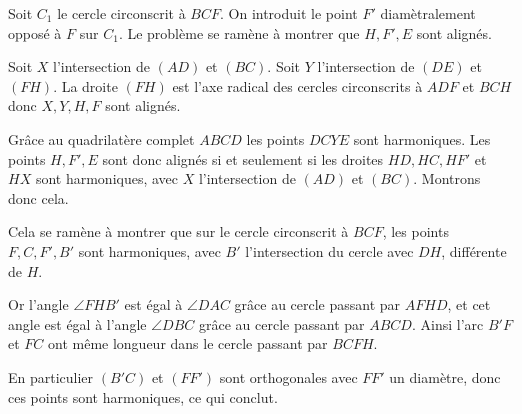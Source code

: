 \begin{sol}

Soit $C_1$ le cercle circonscrit à $BCF$. On introduit le point $F'$ diamètralement opposé à $F$ sur $C_1$. Le problème se ramène à montrer que $H,F',E$ sont alignés.

\medskip

Soit $X$ l'intersection de $(AD)$ et $(BC)$. Soit $Y$ l'intersection de $(DE)$ et $(FH)$. La droite $(FH)$ est l'axe radical des cercles circonscrits à $ADF$ et $BCH$ donc $X,Y,H,F$ sont alignés.

Grâce au quadrilatère complet $ABCD$ les points $DCYE$ sont harmoniques. Les points $H,F',E$ sont donc alignés si et seulement si les droites $HD,HC,HF'$ et $HX$ sont harmoniques, avec $X$ l'intersection de $(AD)$ et $(BC)$. Montrons donc cela.

\medskip

Cela se ramène à montrer que sur le cercle circonscrit à $BCF$, les points $F,C,F',B'$ sont harmoniques, avec $B'$ l'intersection du cercle avec $DH$, différente de $H$.

Or l'angle $\angle FHB'$ est égal à $\angle DAC$ grâce au cercle passant par $AFHD$, et cet angle est égal à l'angle $\angle DBC$ grâce au cercle passant par $ABCD$. Ainsi l'arc $B'F$ et $FC$ ont même longueur dans le cercle passant par $BCFH$.

En particulier $(B'C)$ et $(FF')$ sont orthogonales avec $FF'$ un diamètre, donc ces points sont harmoniques, ce qui conclut.


\end{sol}
